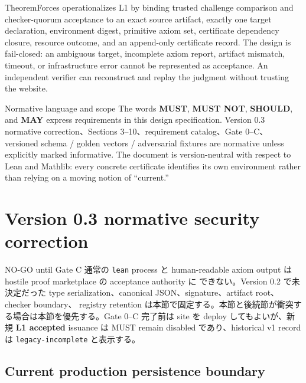 \documentclass[a4paper,11pt]{ltjsarticle}
\newcommand{\term}[1]{\textbf{\color{TFNavy}#1}}
\newcommand{\code}[1]{\texttt{#1}}
\begin{document}
TheoremForces operationalizes L1 by binding trusted challenge comparison and checker-quorum acceptance to an exact source artifact, exactly
one target declaration, environment digest, primitive axiom set, certificate dependency closure, resource outcome, and an
append-only certificate record. The design is fail-closed: an ambiguous target, incomplete axiom
report, artifact mismatch, timeout, or infrastructure error cannot be represented as acceptance.
An independent verifier can reconstruct and replay the judgment without trusting the website.

\begin{decisionbox}{Normative language and scope}
The words \term{MUST}, \term{MUST NOT}, \term{SHOULD}, and \term{MAY} express requirements in this
design specification. Version 0.3 normative correction、Sections 3--10、requirement catalog、Gate 0--C、
versioned schema / golden vectors / adversarial fixtures are normative unless explicitly marked informative. The
document is version-neutral with respect to Lean and Mathlib: every concrete certificate identifies
its own environment rather than relying on a moving notion of ``current.''
\end{decisionbox}

\tableofcontents
\clearpage
{}

\section{Version 0.3 normative security correction}

\begin{warningbox}{NO-GO until Gate C}
通常の \code{lean} process と human-readable axiom output は hostile proof marketplace の acceptance authority に
できない。Version 0.2 で未決定だった type serialization、canonical JSON、signature、artifact root、checker boundary、
registry retention は本節で固定する。本節と後続節が衝突する場合は本節を優先する。Gate 0--C 完了前は site を
deploy してもよいが、新規 \term{L1 accepted} issuance は MUST remain disabled であり、historical v1 record は
\code{legacy-incomplete} と表示する。
\end{warningbox}

\subsection{Current production persistence boundary}
\end{document}

